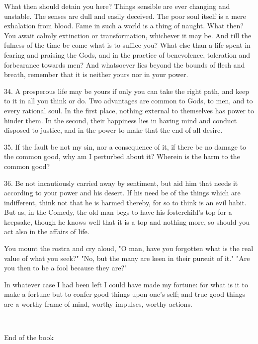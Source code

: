 \documentclass{book}
\newcommand\terminus[1]{\vspace{2em}\emph{#1} \\[2em] \begin{center}End of the \ordinalstring{chapter} book\end{center}}
\begin{document}
What then should detain you here? Things sensible are ever changing
and unstable. The senses are dull and easily deceived. The poor soul
itself is a mere exhalation from blood. Fame in such a world is a
thing of naught. What then? You await calmly extinction or
transformation, whichever it may be. And till the fulness of the time
be come what is to suffice you? What else than a life spent in fearing
and praising the Gods, and in the practice of benevolence, toleration
and forbearance towards men? And whatsoever lies beyond the bounds of
flesh and breath, remember that it is neither yours nor in your power.

34. A prosperous life may be yours if only you can take the right
path, and keep to it in all you think or do. Two advantages are common
to Gods, to men, and to every rational soul. In the first place,
nothing external to themselves has power to hinder them. In the
second, their happiness lies in having mind and conduct disposed to
justice, and in the power to make that the end of all desire.

35. If the fault be not my sin, nor a consequence of it, if there be
no damage to the common good, why am I perturbed about it? Wherein is
the harm to the common good?

36. Be not incautiously carried away by sentiment, but aid him that
needs it according to your power and his desert. If his need be of the
things which are indifferent, think not that he is harmed thereby, for
so to think is an evil habit. But as, in the Comedy, the old man begs
to have his fosterchild's top for a keepsake, though he knows well
that it is a top and nothing more, so should you act also in the
affairs of life.

You mount the rostra and cry aloud, "O man, have you forgotten what is
the real value of what you seek?" "No, but the many are keen in their
pursuit of it." "Are you then to be a fool because they are?"

\newpage

In whatever case I had been left I could have made my fortune: for
what is it to make a fortune but to confer good things upon one's
self; and true good things are a worthy frame of mind, worthy
impulses, worthy actions.

\terminus{}

\chapter[The substance of the Universe...]{}
\end{document}
